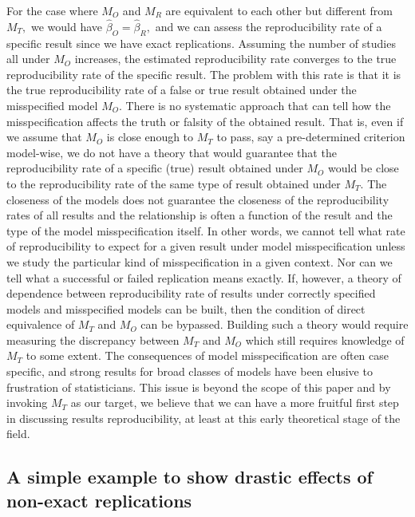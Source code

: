 \documentclass[meta,authordate]{jote-new-article}
\newcounter{result}
\begin{document}
For the case where $M_O$ and $M_R$ are equivalent to each other but different from $M_T,$ we would have $\hat{\beta}_{O}=\hat{\beta}_{R},$ and we can assess the reproducibility rate of a specific result since we have exact replications. Assuming the number of studies all under $M_O$ increases, the estimated reproducibility rate converges to the true reproducibility rate of the specific result. The problem with this rate is that it is the true reproducibility rate of a false or true result obtained under the misspecified model $M_O.$ There is no systematic approach that can tell how the misspecification affects the truth or falsity of the obtained result. That is, even if we assume that $M_O$ is close enough to $M_T$ to pass, say a pre-determined criterion model-wise, we do not have a theory that would guarantee that the reproducibility rate of a specific (true) result obtained under $M_O$ would be close to the reproducibility rate of the same type of result obtained under $M_T.$ The closeness of the models does not guarantee the closeness of the reproducibility rates of all results and the relationship is often a function of the result and the type of the model misspecification itself. In other words, we cannot tell what rate of reproducibility to expect for a given result under model misspecification unless we study the particular kind of misspecification in a given context. Nor can we tell what a successful or failed replication means exactly. If, however, a theory of dependence between reproducibility rate of results under correctly specified models and misspecified models can be built, then the condition of direct equivalence of $M_T$ and $M_O$ can be bypassed. Building such a theory would require measuring the discrepancy between $M_T$ and $M_O$ which still requires knowledge of $M_T$ to some extent. The consequences of model misspecification are often case specific, and strong results for broad classes of models have been elusive to frustration of statisticians. This issue is beyond the scope of this paper and by invoking $M_T$ as our target, we believe that we can have a more fruitful first step in discussing results reproducibility, at least at this early theoretical stage of the field.



\newpage
\subsection{A simple example to show drastic effects of non-exact replications}
\end{document}
